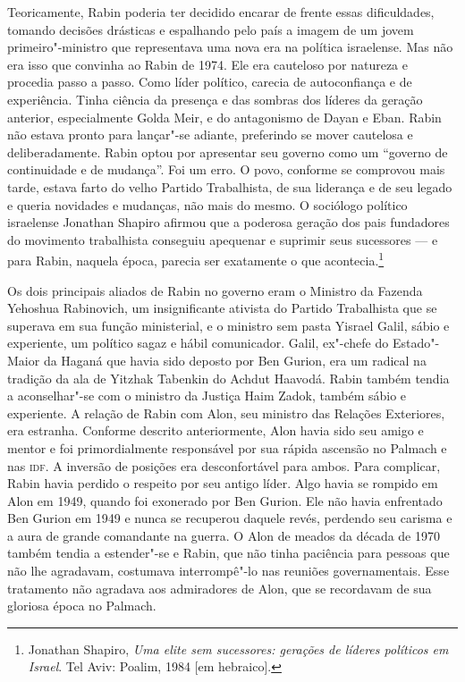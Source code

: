 Teoricamente, Rabin poderia ter decidido encarar de frente essas
dificuldades, tomando decisões drásticas e espalhando pelo país a imagem
de um jovem primeiro"-ministro que representava uma nova era na política
israelense. Mas não era isso que convinha ao Rabin de 1974. Ele era
cauteloso por natureza e procedia passo a passo. Como líder político,
carecia de autoconfiança e de experiência. Tinha ciência da presença e
das sombras dos líderes da geração anterior, especialmente Golda Meir, e
do antagonismo de Dayan e Eban. Rabin não estava pronto para lançar"-se
adiante, preferindo se mover cautelosa e deliberadamente. Rabin optou
por apresentar seu governo como um ``governo de continuidade e de
mudança''. Foi um erro. O povo, conforme se comprovou mais tarde,
estava farto do velho Partido Trabalhista, de sua liderança e de seu
legado e queria novidades e mudanças, não mais do mesmo. O sociólogo
político israelense Jonathan Shapiro afirmou que a poderosa geração dos
pais fundadores do movimento trabalhista conseguiu apequenar e suprimir
seus sucessores --- e para Rabin, naquela época, parecia ser exatamente o
que acontecia.\footnote{Jonathan Shapiro, \textit{Uma elite sem sucessores: gerações de líderes políticos em Israel}. Tel Aviv: Poalim, 1984 {[}em hebraico{]}.}

Os dois principais aliados de Rabin no governo eram o Ministro da
Fazenda Yehoshua Rabinovich, um insignificante ativista do Partido
Trabalhista que se superava em sua função ministerial, e o ministro sem
pasta Yisrael Galil, sábio e experiente, um político sagaz e hábil
comunicador. Galil, ex"-chefe do Estado"-Maior da Haganá que havia sido
deposto por Ben Gurion, era um radical na tradição da ala de Yitzhak
Tabenkin do Achdut Haavodá. Rabin também tendia a aconselhar"-se com o
ministro da Justiça Haim Zadok, também sábio e experiente. A relação de
Rabin com Alon, seu ministro das Relações Exteriores, era estranha.
Conforme descrito anteriormente, Alon havia sido seu amigo e mentor e
foi primordialmente responsável por sua rápida ascensão no Palmach e nas
\textsc{idf}. A inversão de posições era desconfortável para ambos. Para
complicar, Rabin havia perdido o respeito por seu antigo líder. Algo
havia se rompido em Alon em 1949, quando foi exonerado por Ben Gurion.
Ele não havia enfrentado Ben Gurion em 1949 e nunca se recuperou daquele
revés, perdendo seu carisma e a aura de grande comandante na guerra. O
Alon de meados da década de 1970 também tendia a estender"-se e Rabin,
que não tinha paciência para pessoas que não lhe agradavam, costumava
interrompê"-lo nas reuniões governamentais. Esse tratamento não agradava
aos admiradores de Alon, que se recordavam de sua gloriosa época no Palmach.

